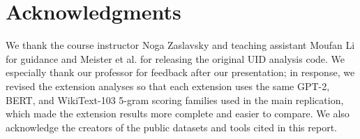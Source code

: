 \documentclass{article}
\begin{document}
\section*{Acknowledgments}

We thank the course instructor Noga Zaslavsky and teaching assistant Moufan Li for guidance and Meister et al. for releasing the original UID analysis code. We especially thank our professor for feedback after our presentation; in response, we revised the extension analyses so that each extension uses the same GPT-2, BERT, and WikiText-103 5-gram scoring families used in the main replication, which made the extension results more complete and easier to compare. We also acknowledge the creators of the public datasets and tools cited in this report.



\end{document}
